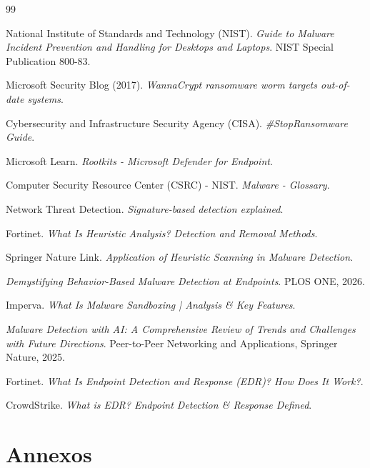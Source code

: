 \documentclass[12pt,a4paper]{report}
\begin{document}
\begin{thebibliography}{99}

National Institute of Standards and Technology (NIST). 
\textit{Guide to Malware Incident Prevention and Handling for Desktops and Laptops}. 
NIST Special Publication 800-83.

Microsoft Security Blog (2017). 
\textit{WannaCrypt ransomware worm targets out-of-date systems}.

Cybersecurity and Infrastructure Security Agency (CISA). 
\textit{\#StopRansomware Guide}.

Microsoft Learn. 
\textit{Rootkits - Microsoft Defender for Endpoint}.

Computer Security Resource Center (CSRC) - NIST. 
\textit{Malware - Glossary}.

Network Threat Detection. 
\textit{Signature-based detection explained}.

Fortinet. 
\textit{What Is Heuristic Analysis? Detection and Removal Methods}.

Springer Nature Link. 
\textit{Application of Heuristic Scanning in Malware Detection}.

\textit{Demystifying Behavior-Based Malware Detection at Endpoints}. 
PLOS ONE, 2026.

Imperva. 
\textit{What Is Malware Sandboxing | Analysis \& Key Features}.

\textit{Malware Detection with AI: A Comprehensive Review of Trends and Challenges with Future Directions}. 
Peer-to-Peer Networking and Applications, Springer Nature, 2025.

Fortinet. 
\textit{What Is Endpoint Detection and Response (EDR)? How Does It Work?}.

CrowdStrike. 
\textit{What is EDR? Endpoint Detection \& Response Defined}.

\end{thebibliography}


\appendix
\chapter{Annexos}
\label{ch:annexos}
\end{document}

